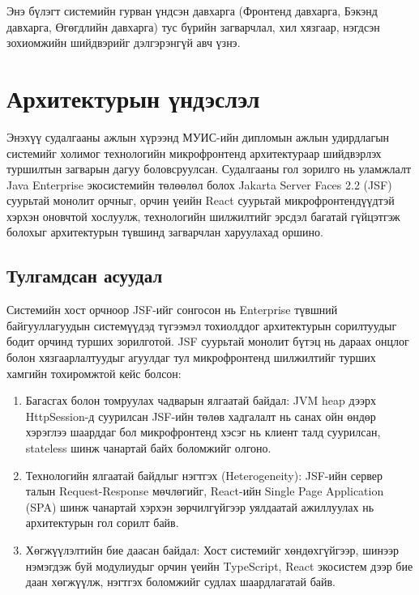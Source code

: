 
\hspace*{0.6cm}Энэ бүлэгт системийн гурван үндсэн
давхарга (Фронтенд давхарга, Бэкэнд давхарга, Өгөгдлийн давхарга) тус бүрийн загварчлал, хил
хязгаар, нэгдсэн зохиомжийн шийдвэрийг дэлгэрэнгүй авч үзнэ.

\section{Архитектурын үндэслэл}

Энэхүү судалгааны ажлын хүрээнд МУИС-ийн дипломын ажлын удирдлагын системийг холимог технологийн микрофронтенд архитектураар шийдвэрлэх туршилтын загварын дагуу боловсруулсан. Судалгааны гол зорилго нь уламжлалт Java Enterprise экосистемийн төлөөлөл болох Jakarta Server Faces 2.2 (JSF) суурьтай монолит орчныг, орчин үеийн React суурьтай микрофронтендүүдтэй хэрхэн оновчтой хослуулж, технологийн шилжилтийг эрсдэл багатай гүйцэтгэж болохыг архитектурын түвшинд загварчлан харуулахад оршино.

\subsection{Тулгамдсан асуудал}

Системийн хост орчноор JSF-ийг сонгосон нь Enterprise түвшний байгууллагуудын системүүдэд түгээмэл тохиолддог архитектурын сорилтуудыг бодит орчинд турших зорилготой. JSF суурьтай монолит бүтэц нь дараах онцлог болон хязгаарлалтуудыг агуулдаг тул микрофронтенд шилжилтийг турших хамгийн тохиромжтой кейс болсон:

\begin{enumerate}
    \item Багасгах болон томруулах чадварын ялгаатай байдал: JVM heap дээрх HttpSession-д суурилсан JSF-ийн төлөв хадгалалт нь санах ойн өндөр хэрэглээ шаарддаг бол микрофронтенд хэсэг нь клиент талд суурилсан, stateless шинж чанартай байх боломжийг олгоно.
    \item Технологийн ялгаатай байдлыг нэгтгэх (Heterogeneity): JSF-ийн сервер талын Request-Response мөчлөгийг, React-ийн Single Page Application (SPA) шинж чанартай хэрхэн зөрчилгүйгээр уялдаатай ажиллуулах нь архитектурын гол сорилт байв.
    \item Хөгжүүлэлтийн бие даасан байдал: Хост системийг хөндөхгүйгээр, шинээр нэмэгдэж буй модулиудыг орчин үеийн TypeScript, React экосистем дээр бие даан хөгжүүлж, нэгтгэх боломжийг судлах шаардлагатай байв.
\end{enumerate}

